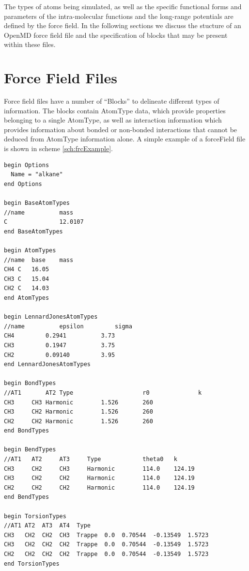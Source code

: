 \documentclass[]{book}
\begin{document}
The types of atoms being simulated, as well as the specific functional
forms and parameters of the intra-molecular functions and the
long-range potentials are defined by the force field. In the following
sections we discuss the stucture of an OpenMD force field file and the
specification of blocks that may be present within these files.

\section{\label{section:frcFile}Force Field Files}

Force field files have a number of ``Blocks'' to delineate different
types of information.  The blocks contain AtomType data, which provide
properties belonging to a single AtomType, as well as interaction
information which provides information about bonded or non-bonded
interactions that cannot be deduced from AtomType information alone.
A simple example of a forceField file is shown in scheme
\ref{sch:frcExample}.

\begin{lstlisting}[float,caption={[An example of a complete OpenMD
 force field file for straight-chain united-atom alkanes.] An example
 showing a complete OpenMD force field for straight-chain united-atom
 alkanes.}, label={sch:frcExample}] 
begin Options 
  Name = "alkane" 
end Options

begin BaseAtomTypes  
//name          mass  
C               12.0107
end BaseAtomTypes

begin AtomTypes
//name  base    mass
CH4	C	16.05		
CH3	C	15.04		
CH2	C	14.03		
end AtomTypes

begin LennardJonesAtomTypes
//name          epsilon         sigma
CH4       	0.2941          3.73
CH3       	0.1947          3.75
CH2       	0.09140         3.95
end LennardJonesAtomTypes

begin BondTypes
//AT1       AT2 Type                    r0              k
CH3	    CH3	Harmonic		1.526		260
CH3	    CH2	Harmonic		1.526		260
CH2	    CH2	Harmonic		1.526		260
end BondTypes

begin BendTypes
//AT1   AT2     AT3     Type            theta0   k
CH3     CH2     CH3     Harmonic        114.0    124.19
CH3     CH2     CH2     Harmonic        114.0    124.19
CH2     CH2     CH2     Harmonic        114.0    124.19
end BendTypes

begin TorsionTypes
//AT1 AT2  AT3  AT4  Type    
CH3   CH2  CH2  CH3  Trappe  0.0  0.70544  -0.13549  1.5723
CH3   CH2  CH2  CH2  Trappe  0.0  0.70544  -0.13549  1.5723  
CH2   CH2  CH2  CH2  Trappe  0.0  0.70544  -0.13549  1.5723  
end TorsionTypes
\end{lstlisting}
\end{document}
